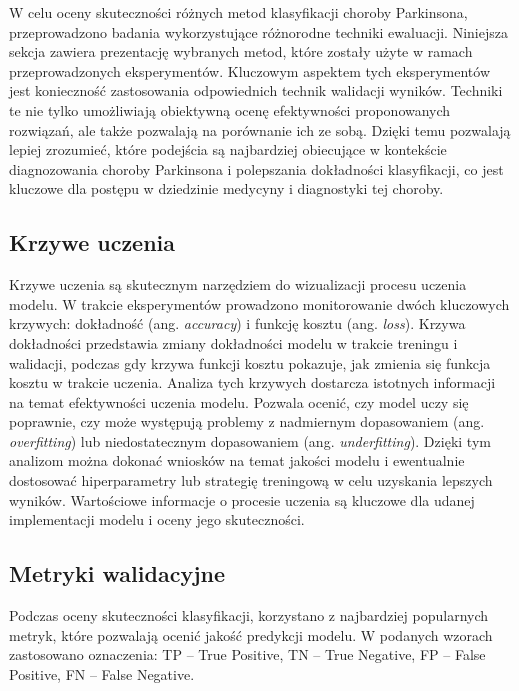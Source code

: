 W celu oceny skuteczności różnych metod klasyfikacji choroby Parkinsona, przeprowadzono badania wykorzystujące różnorodne techniki ewaluacji.
Niniejsza sekcja zawiera prezentację wybranych metod, które zostały użyte w ramach przeprowadzonych eksperymentów.
Kluczowym aspektem tych eksperymentów jest konieczność zastosowania odpowiednich technik walidacji wyników.
Techniki te nie tylko umożliwiają obiektywną ocenę efektywności proponowanych rozwiązań, ale także pozwalają na porównanie ich ze sobą.
Dzięki temu pozwalają lepiej zrozumieć, które podejścia są najbardziej obiecujące w kontekście diagnozowania choroby Parkinsona i polepszania dokładności klasyfikacji, co jest kluczowe dla postępu w dziedzinie medycyny i diagnostyki tej choroby.

\subsection{Krzywe uczenia}
\label{subsec:krzywe-uczenia}

Krzywe uczenia są skutecznym narzędziem do wizualizacji procesu uczenia modelu.
W trakcie eksperymentów prowadzono monitorowanie dwóch kluczowych krzywych: dokładność (ang. \emph{accuracy}) i funkcję kosztu (ang. \emph{loss}).
Krzywa dokładności przedstawia zmiany dokładności modelu w trakcie treningu i walidacji, podczas gdy krzywa funkcji kosztu pokazuje, jak zmienia się funkcja kosztu w trakcie uczenia.
Analiza tych krzywych dostarcza istotnych informacji na temat efektywności uczenia modelu. Pozwala ocenić, czy model uczy się poprawnie, czy może występują problemy z
nadmiernym dopasowaniem  (ang. \emph{overfitting}) lub niedostatecznym dopasowaniem (ang. \emph{underfitting}).
Dzięki tym analizom można dokonać wniosków na temat jakości modelu i ewentualnie dostosować hiperparametry lub strategię treningową w celu uzyskania lepszych wyników.
Wartościowe informacje o procesie uczenia są kluczowe dla udanej implementacji modelu i oceny jego skuteczności.

\subsection{Metryki walidacyjne}
\label{subsec:metryki-waldiacyjne}

Podczas oceny skuteczności klasyfikacji, korzystano z najbardziej popularnych metryk, które pozwalają ocenić jakość predykcji modelu.
W podanych wzorach zastosowano oznaczenia:  TP – True Positive, TN – True Negative, FP – False Positive, FN – False Negative.


